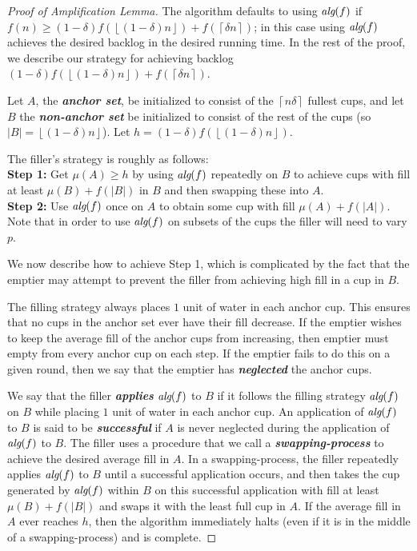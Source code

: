 \documentclass[twocolumn]{article}[10pt]
\newcommand{\defn}[1]{{\textit{\textbf{\boldmath #1}}}\xspace}
\newcommand{\alg}[1]{\textit{\text{alg}}({#1})}
\newcommand{\floor}[1]{\left\lfloor #1 \right\rfloor}
\newcommand{\ceil}[1]{\left\lceil #1 \right\rceil}
\begin{document}
\begin{proof}[Proof of Amplification Lemma]
The algorithm defaults to using $\alg{f}$ if $f(n) \ge
(1-\delta)f(\floor{(1-\delta)n}) + f(\ceil{\delta n})$; in this
case using $\alg{f}$
achieves the desired backlog in the desired running time. In the
rest of the proof, we describe our strategy for achieving backlog
$(1-\delta)f(\floor{(1-\delta)n}) + f(\ceil{\delta n})$. 

  Let $A$, the \defn{anchor set}, be initialized to consist of
  the $\ceil{n\delta}$ fullest cups, and let $B$ the
  \defn{non-anchor set} be initialized to consist of the rest of
  the cups (so $|B| = \floor{(1-\delta)n}$). Let $h =
  (1-\delta)f(\floor{(1-\delta)n}).$

  The filler's strategy is roughly as follows: \\
  \textbf{Step 1:} Get $\mu(A) \ge h$ by using $\alg{f}$
  repeatedly on $B$ to achieve cups with fill at least $\mu(B) +
  f(|B|)$ in $B$ and then swapping these into $A$.\\
  \textbf{Step 2:} Use $\alg{f}$ once on $A$ to obtain some cup
  with fill $\mu(A)+f(|A|)$.\\
  Note that in order to use $\alg{f}$ on subsets of the cups the
  filler will need to vary $p$.

  We now describe how to achieve Step 1, which is
  complicated by the fact that the emptier may attempt to
  prevent the filler from achieving high fill in a cup
  in $B$.

  The filling strategy always places $1$ unit of water in each
  anchor cup. This ensures that no cups in the anchor set ever
  have their fill decrease. If the emptier wishes to keep the
  average fill of the anchor cups from increasing, then emptier
  must empty from every anchor cup on each step. If the emptier
  fails to do this on a given round, then we say that the emptier
  has \defn{neglected} the anchor cups. 

  We say that the filler \defn{applies} $\alg{f}$ to $B$ if it
  follows the filling strategy $\alg{f}$ on $B$ while placing $1$
  unit of water in each anchor cup. An application of $\alg{f}$ to
  $B$ is said to be \defn{successful} if $A$ is never neglected
  during the application of $\alg{f}$ to $B$. The filler uses a
  procedure that we call a \defn{swapping-process} to achieve the
  desired average fill in $A$. In a swapping-process, the filler
  repeatedly applies $\alg{f}$ to $B$ until a successful
  application occurs, and then takes the cup generated by
  $\alg{f}$ within $B$ on this successful application with fill at
  least $\mu(B) + f(|B|)$ and swaps it with the least full cup in
  $A$. If the average fill in $A$ ever reaches $h$, then the
  algorithm immediately halts (even if it is in the middle of a
  swapping-process) and is complete.
  

\end{proof}
\end{document}
